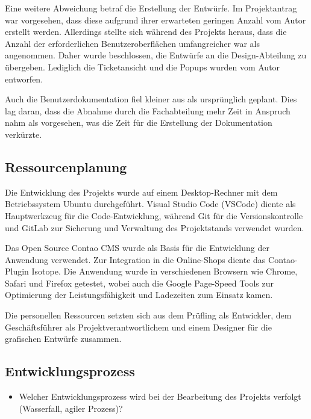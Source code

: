 Eine weitere Abweichung betraf die Erstellung der Entwürfe. Im Projektantrag war vorgesehen, dass diese aufgrund ihrer erwarteten geringen Anzahl vom Autor erstellt werden. Allerdings stellte sich während des Projekts heraus, dass die Anzahl der erforderlichen Benutzeroberflächen umfangreicher war als angenommen. Daher wurde beschlossen, die Entwürfe an die Design-Abteilung zu übergeben. Lediglich die Ticketansicht und die Popups wurden vom Autor entworfen.

Auch die Benutzerdokumentation fiel kleiner aus als ursprünglich geplant. Dies lag daran, dass die Abnahme durch die Fachabteilung mehr Zeit in Anspruch nahm als vorgesehen, was die Zeit für die Erstellung der Dokumentation verkürzte.

\subsection{Ressourcenplanung}
\label{sec:Ressourcenplanung}

Die Entwicklung des Projekts wurde auf einem Desktop-Rechner mit dem Betriebssystem Ubuntu durchgeführt. Visual Studio Code (VSCode) diente als Hauptwerkzeug für die Code-Entwicklung, während Git für die Versionskontrolle und GitLab zur Sicherung und Verwaltung des Projektstands verwendet wurden.

Das Open Source Contao CMS wurde als Basis für die Entwicklung der Anwendung verwendet. Zur Integration in die Online-Shops diente das Contao-Plugin Isotope. Die Anwendung wurde in verschiedenen Browsern wie Chrome, Safari und Firefox getestet, wobei auch die Google Page-Speed Tools zur Optimierung der Leistungsfähigkeit und Ladezeiten zum Einsatz kamen.

Die personellen Ressourcen setzten sich aus dem Prüfling als Entwickler, dem Geschäftsführer als Projektverantwortlichem und einem Designer für die grafischen Entwürfe zusammen.
\paragraph{}

\subsection{Entwicklungsprozess}
\label{sec:Entwicklungsprozess}
\begin{itemize}
	\item Welcher Entwicklungsprozess wird bei der Bearbeitung des Projekts verfolgt (\zB Wasserfall, agiler Prozess)?
\end{itemize}
